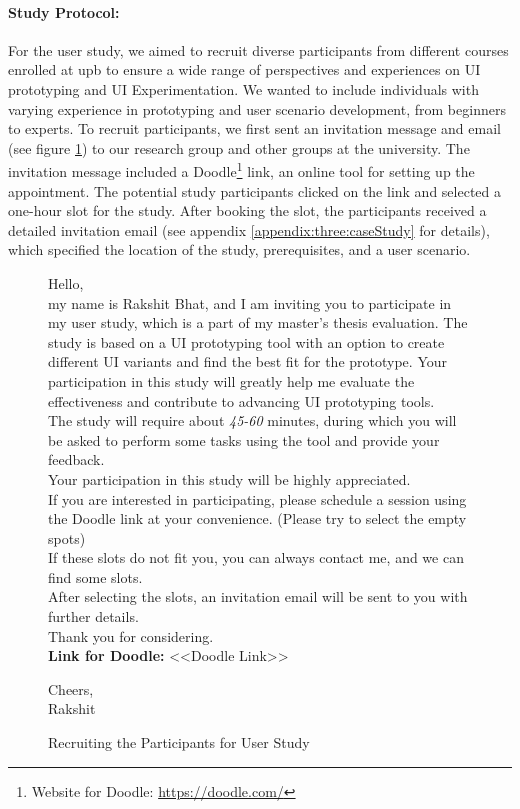 \paragraph{Study Protocol:}
For the user study, we aimed to recruit diverse participants from different courses enrolled at \ac{upb} to ensure a wide range of perspectives and experiences on UI prototyping and UI Experimentation. 
We wanted to include individuals with varying experience in prototyping and user scenario development, from beginners to experts.
To recruit participants, we first sent an invitation message and email (see figure \ref{evaluation:fig:invitation}) to our research group and other groups at the university. 
The invitation message included a Doodle\footnote{Website for Doodle: \url{https://doodle.com/}} link, an online tool for setting up the appointment.
The potential study participants clicked on the link and selected a one-hour slot for the study. 
After booking the slot, the participants received a detailed invitation email  (see appendix \ref{appendix:three:caseStudy} for details), which specified the location of the study, prerequisites, and a user scenario.
\begin{figure}[ht]
  \centering
  \begin{tcolorbox}[title=\texttt{From: Rakshit\\ To: various groups\\ Subject: Invitation to Participate in a User Study}]
  Hello,\\
    
  my name is Rakshit Bhat, and I am inviting you to participate in my user study, which is a part of my master's thesis evaluation. 
  The study is based on a UI prototyping tool with an option to create different UI variants and find the best fit for the prototype.
  Your participation in this study will greatly help me evaluate the effectiveness and contribute to advancing UI prototyping tools.\\

  The study will require about \textit{45-60} minutes, during which you will be asked to perform some tasks using the tool and provide your feedback.\\
  Your participation in this study will be highly appreciated.\\
  If you are interested in participating, please schedule a session using the Doodle link at your convenience. (Please try to select the empty spots)\\
  If these slots do not fit you, you can always contact me, and we can find some slots.\\

  After selecting the slots, an invitation email will be sent to you with further details.\\
  Thank you for considering.\\
  
  \textbf{Link for Doodle:}
  <<Doodle Link>>
    
  Cheers,\\
  Rakshit
  \end{tcolorbox}  
  \caption{Recruiting the Participants for User Study}
  \label{evaluation:fig:invitation}
\end{figure}

